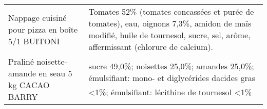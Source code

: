\begin{longtable}{p{5cm}p{10cm}}
                                                          Nappage cuisiné pour pizza en boîte 5/1 BUITONI &                                                                                                                                                                                                                                                                                                                                                                                                                                                                                                                                                                                                                                                                                                                                                                                                                                                              Tomates 52\% (tomates concassées et purée de tomates), eau, oignons 7,3\%, amidon de maïs modifié, huile de tournesol, sucre, sel, arôme, affermissant (chlorure de calcium). \\
                                                         Praliné noisette-amande en seau 5 kg CACAO BARRY &                                                                                                                                                                                                                                                                                                                                                                                                                                                                                                                                                                                                                                                                                                                                                                                                                                                                                               sucre 49,0\%; noisettes 25,0\%; amandes 25,0\%; émulsifiant: mono- et diglycérides dacides gras <1\%; émulsifiant: lécithine de tournesol <1\% \\

\end{longtable}
